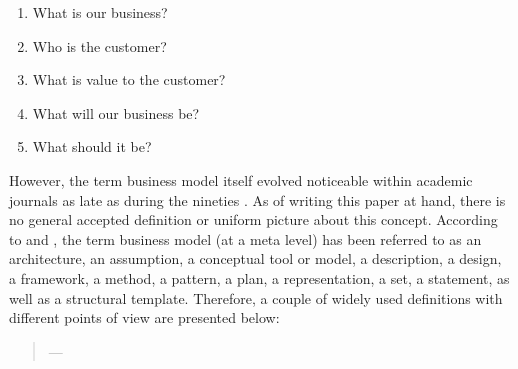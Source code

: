 \begin{enumerate}[parsep=0pt, topsep=0pt, itemsep=0pt]
	\item What is our business?
	\item Who is the customer?
	\item What is value to the customer?
	\item What will our business be?
	\item What should it be?
\end{enumerate}

However, the term business model itself evolved noticeable within academic journals as late as during the nineties . As of writing this paper at hand, there is no general accepted definition or uniform picture about this concept. According to \citet[p. 726]{Morris2005} and \citet[p. 1022]{Zott2011}, the term business model (at a meta level) has been referred to as an architecture, an assumption, a conceptual tool or model, a description, a design, a framework, a method, a pattern, a plan, a representation, a set, a statement, as well as a structural template. Therefore, a couple of widely used definitions with different points of view are presented below:
	
\begin{quotation}\vspace*{-5pt}{\slshape 
[A business model is] an architecture for the product, service and information flows, including a description of the various business actors and their roles; and a description of the potential benefits for the various business actors; and a description of the sources of revenues.}
\vspace*{-7pt}
\begin{flushright}
	--- \citealp[p. 2]{Timmers1998}
\end{flushright}
\end{quotation}



